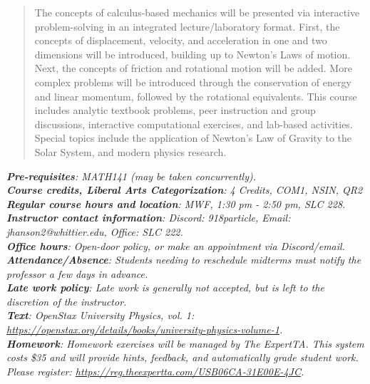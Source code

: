 \documentclass[10pt]{article}
\begin{document}
\maketitle

\begin{abstract}
The concepts of calculus-based mechanics will be presented via interactive problem-solving in an integrated lecture/laboratory format.  First, the concepts of displacement, velocity, and acceleration in one and two dimensions will be introduced, building up to Newton's Laws of motion.  Next, the concepts of friction and rotational motion will be added.  More complex problems will be introduced through the conservation of energy and linear momentum, followed by the rotational equivalents.  This course includes analytic textbook problems, peer instruction and group discussions, interactive computational exercises, and lab-based activities.  Special topics include the application of Newton's Law of Gravity to the Solar System, and modern physics research.
\end{abstract} \vspace{0.1cm}
\noindent
\textit{\textbf{Pre-requisites}: MATH141 (may be taken concurrently).} \\
\textit{\textbf{Course credits, Liberal Arts Categorization}: 4 Credits, COM1, NSIN, QR2} \\
\textit{\textbf{Regular course hours and location}: MWF, 1:30 pm - 2:50 pm, SLC 228.} \\
\textit{\textbf{Instructor contact information}: Discord: 918particle, Email: jhanson2@whittier.edu, Office: SLC 222.} \\
\textit{\textbf{Office hours}: Open-door policy, or make an appointment via Discord/email.} \\
\textit{\textbf{Attendance/Absence}: Students needing to reschedule midterms must notify the professor a few days in advance.} \\ 
\textit{\textbf{Late work policy}: Late work is generally not accepted, but is left to the discretion of the instructor.} \\
\textit{\textbf{Text}: OpenStax University Physics, vol. 1: \url{https://openstax.org/details/books/university-physics-volume-1}.} \\
\textit{\textbf{Homework}: Homework exercises will be managed by The ExpertTA.  This system costs \$35 and will provide hints, feedback, and automatically grade student work.  Please register: \url{https://reg.theexpertta.com/USB06CA-31E00E-4JC}.} \\
\end{document}
